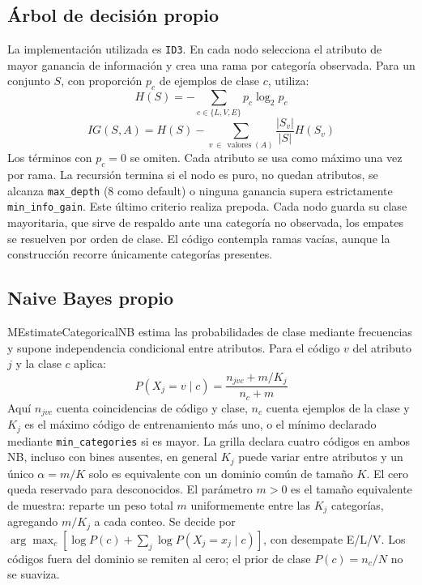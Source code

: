 \documentclass[conference]{IEEEtran}
\begin{document}
\subsection{Árbol de decisión propio}
La implementación utilizada es \texttt{ID3}. En cada nodo selecciona el atributo de mayor ganancia de información y crea una rama por categoría observada. Para un conjunto $S$, con proporción $p_c$ de ejemplos de clase $c$, utiliza:
\begin{equation}
H(S) = -\sum_{c \in \{L,V,E\}} p_c \log_2 p_c
\label{eq:entropia}
\end{equation}
\begin{equation}
IG(S, A) = H(S) - \sum_{v \,\in\, \operatorname{valores}(A)} \frac{|S_v|}{|S|} H(S_v)
\label{eq:ganancia}
\end{equation}
Los términos con $p_c=0$ se omiten. Cada atributo se usa como máximo una vez por rama. La recursión termina si el nodo es puro, no quedan atributos, se alcanza \texttt{max\_depth} (8 como default) o ninguna ganancia supera estrictamente \texttt{min\_info\_gain}. Este último criterio realiza prepoda. Cada nodo guarda su clase mayoritaria, que sirve de respaldo ante una categoría no observada, los empates se resuelven por orden de clase. El código contempla ramas vacías, aunque la construcción recorre únicamente categorías presentes.

\subsection{Naive Bayes propio}
MEstimateCategoricalNB estima las probabilidades de clase mediante frecuencias y supone independencia condicional entre atributos. Para el código $v$ del atributo $j$ y la clase $c$ aplica:
\begin{equation}
P(X_j=v\mid c)=\frac{n_{jvc}+m/K_j}{n_c+m}
\label{eq:m-estimate}
\end{equation}
Aquí $n_{jvc}$ cuenta coincidencias de código y clase, $n_c$ cuenta ejemplos de la clase y $K_j$ es el máximo código de entrenamiento más uno, o el mínimo declarado mediante \texttt{min\_categories} si es mayor. La grilla declara cuatro códigos en ambos NB, incluso con bines ausentes, en general $K_j$ puede variar entre atributos y un único $\alpha=m/K$ solo es equivalente con un dominio común de tamaño $K$. El cero queda reservado para desconocidos. El parámetro $m>0$ es el tamaño equivalente de muestra: reparte un peso total $m$ uniformemente entre las $K_j$ categorías, agregando $m/K_j$ a cada conteo. Se decide por $\arg\max_c[\log P(c)+\sum_j\log P(X_j=x_j\mid c)]$, con desempate E/L/V. Los códigos fuera del dominio se remiten al cero; el prior de clase $P(c)=n_c/N$ no se suaviza.
\end{document}
